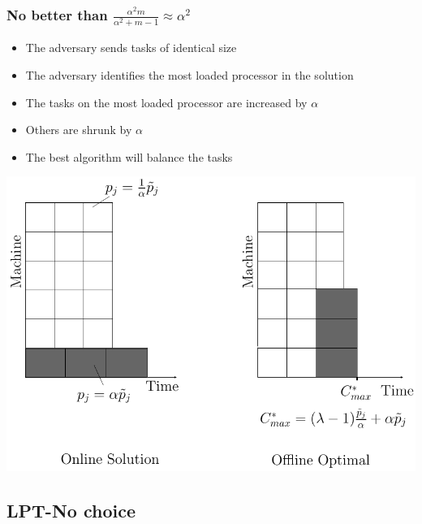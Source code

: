 \documentclass[usenames,dvipsnames]{beamer}
\begin{document}
\begin{frame}
  \frametitle{No better than $\frac{\alpha^{2}m }{\alpha^{2} + m-1} \approx \alpha^2$}

  \begin{itemize}
  \item The adversary sends tasks of identical size
  \item The adversary identifies the most loaded processor in the solution
  \item The tasks on the most loaded processor are increased by $\alpha$
  \item Others are shrunk by $\alpha$
  \item The best algorithm will balance the tasks
  \end{itemize}
  
  \begin{center}
    \includegraphics[width=.6\linewidth]{figs/model1.pdf}
  \end{center}
\end{frame}

\subsection{LPT-No choice}
\end{document}
